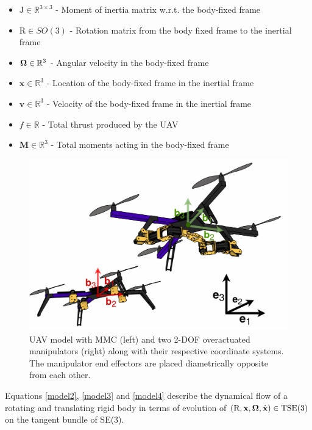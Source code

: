 \begin{itemize}
	\item $\text{J} \in \mathbb{R}^{3 \times 3}$ - Moment of inertia matrix w.r.t. the body-fixed frame
	
	\item $\text{R} \in SO(3)$ - Rotation matrix from the body fixed frame to the inertial frame
	
	\item $\boldsymbol{\Omega} \in \mathbb{R}^3$ - Angular velocity in the body-fixed frame
	
	\item $\textbf{x} \in \mathbb{R}^3$ - Location of the body-fixed frame in the inertial frame
	
	\item $\textbf{v} \in \mathbb{R}^3$ - Velocity of the body-fixed frame in the inertial frame
	
	\item $f \in \mathbb{R}$ - Total thrust produced by the UAV
	
	\item $\textbf{M} \in \mathbb{R}^3$ - Total moments acting in the body-fixed frame
\end{itemize}
\begin{figure}[h!]
	\includegraphics[width=\columnwidth]{pictures/uav.png}	
	\centering
	\caption{UAV model with MMC (left) and two 2-DOF overactuated manipulators (right) along with their respective coordinate systems. The manipulator end effectors are placed diametrically opposite from each other.}
	\label{fig:uav_model}
\end{figure}
\noindent Equations \eqref{model2}, \eqref{model3} and \eqref{model4} describe the dynamical flow of a rotating and translating rigid body in terms of evolution of $(\text{R},\textbf{x},\boldsymbol{\Omega},\dot{\textbf{x}})\in \text{TSE}(3)$ on the tangent bundle of SE(3). 

